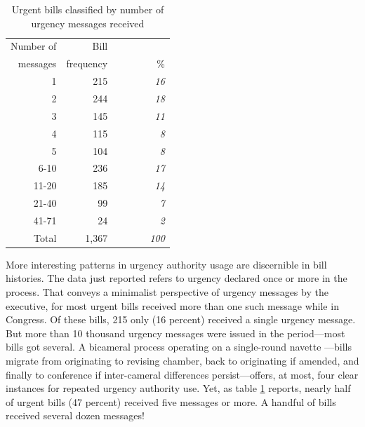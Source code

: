 \documentclass[letter,12pt]{article}
\begin{document}
\begin{table}
\begin{center}
\begin{tabular}{rrr}
Number of &      Bill &     \\
messages  & frequency &  ~~~~~~~~\% \\ \hline
1                 &  215      &  \emph{16}   \\
2                 &  244      &  \emph{18}   \\
3                 &  145      &  \emph{11}   \\
4                 &  115      &  \emph{8}    \\
5                 &  104      &  \emph{8}    \\
6-10              &  236      &  \emph{17}   \\
11-20             &  185      &  \emph{14}   \\
21-40             &  99       &  \emph{7}    \\
41-71             &  24       &  \emph{2}    \\
Total             & 1,367     & \emph{100}   \\ \hline
\end{tabular}
\caption{Urgent bills classified by number of urgency messages received}\label{T:billFreqByNurg}
\end{center}
\end{table}

More interesting patterns in urgency authority usage are discernible in bill histories. The data just reported refers to urgency declared once or more in the process. That conveys a minimalist perspective of urgency messages by the executive, for most urgent bills received more than one such message while in Congress. Of these bills, 215 only (16 percent) received a single urgency message. But more than 10 thousand urgency messages were issued in the period---most bills got several. A bicameral process operating on a single-round navette \citep{tsebelis.money.1997}---bills migrate from originating to revising chamber, back to originating if amended, and finally to conference if inter-cameral differences persist---offers, at most, four clear instances for repeated urgency authority use. Yet, as table \ref{T:billFreqByNurg} reports, nearly half of urgent bills (47 percent) received five messages or more. A handful of bills received several dozen messages! 
\end{document}
